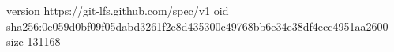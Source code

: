 version https://git-lfs.github.com/spec/v1
oid sha256:0e059d0bf09f05dabd3261f2e8d435300c49768bb6e34e38df4ecc4951aa2600
size 131168
